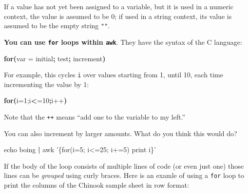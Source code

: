 \documentclass[]{krantz}
\makeatletter
\newenvironment{Shaded}{\begin{snugshade}}{\end{snugshade}}
\newcommand{\BuiltInTok}[1]{#1}
\newcommand{\ExtensionTok}[1]{#1}
\newcommand{\FunctionTok}[1]{\textcolor[rgb]{0,0,0}{#1}}
\newcommand{\KeywordTok}[1]{\textcolor[rgb]{0.27,0.27,0.27}{\textbf{#1}}}
\newcommand{\NormalTok}[1]{#1}
\newcommand{\OperatorTok}[1]{\textcolor[rgb]{0.43,0.43,0.43}{\textbf{#1}}}
\newcommand{\StringTok}[1]{\textcolor[rgb]{0.5,0.5,0.5}{#1}}
\newcommand{\VariableTok}[1]{\textcolor[rgb]{0,0,0}{#1}}
\newenvironment{kframe}{%
\medskip{}
\setlength{\fboxsep}{.8em}
 \def\at@end@of@kframe{}%
 \ifinner\ifhmode%
  \def\at@end@of@kframe{\end{minipage}}%
  \begin{minipage}{\columnwidth}%
 \fi\fi%
 \def\FrameCommand##1{\hskip\@totalleftmargin \hskip-\fboxsep
 \colorbox{shadecolor}{##1}\hskip-\fboxsep
     \hskip-\linewidth \hskip-\@totalleftmargin \hskip\columnwidth}%
 \MakeFramed {\advance\hsize-\width
   \@totalleftmargin\z@ \linewidth\hsize
   \@setminipage}}%
 {\par\unskip\endMakeFramed%
 \at@end@of@kframe}
\renewenvironment{Shaded}{\begin{kframe}}{\end{kframe}}
\makeatother
\begin{document}
If a value has not yet been assigned to a variable, but it is used in a numeric
context, the value is assumed to be 0; if used in a string context, its value
is assumed to be the empty string \texttt{""}.

\textbf{You can use \texttt{for} loops within \texttt{awk}}. They have the syntax of the C language:

\begin{Shaded}
\begin{Highlighting}[]
\KeywordTok{for(}\ExtensionTok{var}\NormalTok{ = initial}\KeywordTok{;} \BuiltInTok{test}\KeywordTok{;} \ExtensionTok{increment}\KeywordTok{)}
\end{Highlighting}
\end{Shaded}

For example, this cycles \texttt{i} over values starting from 1, until 10, each
time incrementing the value by 1:

\begin{Shaded}
\begin{Highlighting}[]
\KeywordTok{for(}\VariableTok{i=}\NormalTok{1;}\ExtensionTok{i}\OperatorTok{<}\NormalTok{=10}\KeywordTok{;}\ExtensionTok{i++}\KeywordTok{)}
\end{Highlighting}
\end{Shaded}

Note that the \texttt{++} means ``add one to the variable to my left.''

You can also increment by larger amounts. What do you think this would do?

\begin{Shaded}
\begin{Highlighting}[]
\BuiltInTok{echo}\NormalTok{ boing }\KeywordTok{|} \FunctionTok{awk} \StringTok{'\{for(i=5; i<=25; i+=5) print i\}'} 
\end{Highlighting}
\end{Shaded}

If the body of the loop consists of multiple lines of code (or even just one) those lines
can be \emph{grouped} using curly braces.
Here is an examle of using a \texttt{for} loop to print the columns of the Chinook sample sheet
in row format:

\begin{Shaded}
\end{Shaded}
\end{document}
